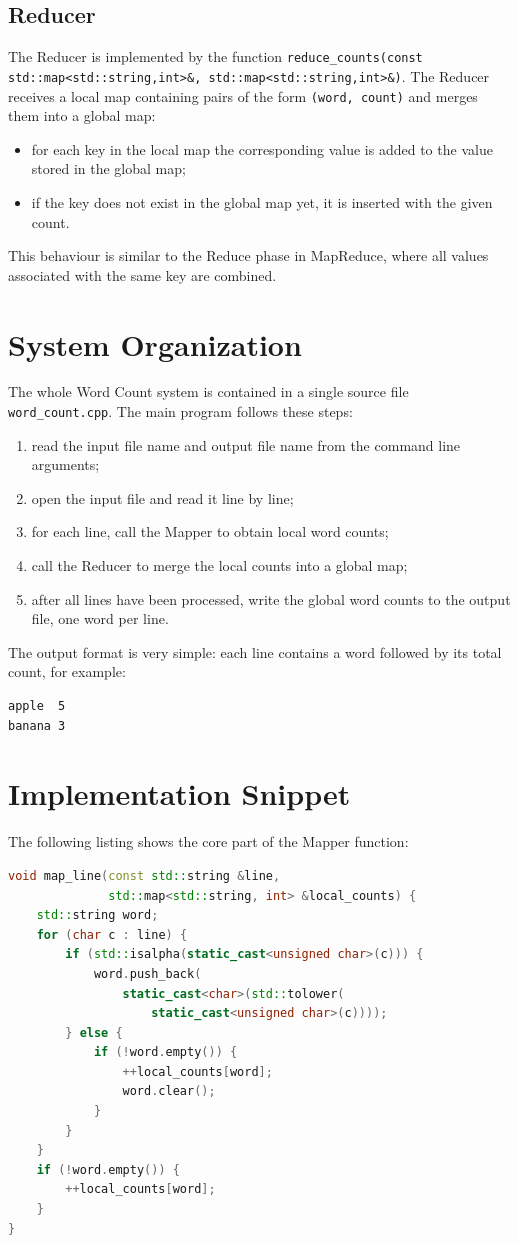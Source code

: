 \documentclass[a4paper,11pt]{article}
\begin{document}
\subsection*{Reducer}
The Reducer is implemented by the function
\texttt{reduce\_counts(const std::map<std::string,int>\&,
std::map<std::string,int>\&)}. The Reducer receives a local map
containing pairs of the form \texttt{(word, count)} and merges them
into a global map:
\begin{itemize}
  \item for each key in the local map the corresponding value is added
  to the value stored in the global map;
  \item if the key does not exist in the global map yet, it is inserted
  with the given count.
\end{itemize}
This behaviour is similar to the Reduce phase in MapReduce, where all
values associated with the same key are combined.

\section{System Organization}
The whole Word Count system is contained in a single source file
\texttt{word\_count.cpp}. The main program follows these steps:
\begin{enumerate}
  \item read the input file name and output file name from the command
  line arguments;
  \item open the input file and read it line by line;
  \item for each line, call the Mapper to obtain local word counts;
  \item call the Reducer to merge the local counts into a global map;
  \item after all lines have been processed, write the global word
  counts to the output file, one word per line.
\end{enumerate}
The output format is very simple: each line contains a word followed by
its total count, for example:
\begin{verbatim}
apple  5
banana 3
\end{verbatim}

\section{Implementation Snippet}
The following listing shows the core part of the Mapper function:

\begin{lstlisting}[language=C++]
void map_line(const std::string &line,
              std::map<std::string, int> &local_counts) {
    std::string word;
    for (char c : line) {
        if (std::isalpha(static_cast<unsigned char>(c))) {
            word.push_back(
                static_cast<char>(std::tolower(
                    static_cast<unsigned char>(c))));
        } else {
            if (!word.empty()) {
                ++local_counts[word];
                word.clear();
            }
        }
    }
    if (!word.empty()) {
        ++local_counts[word];
    }
}
\end{lstlisting}
\end{document}
